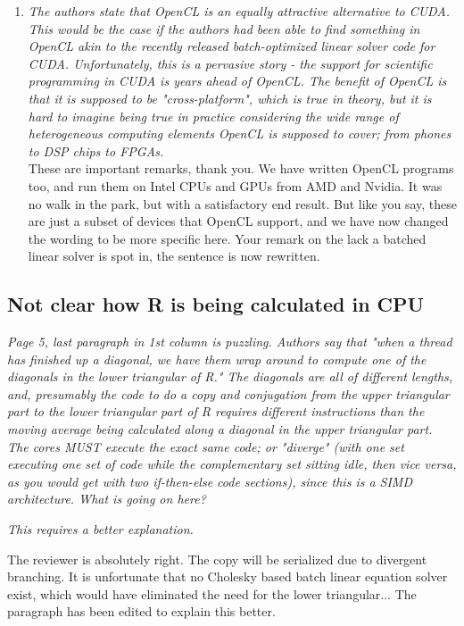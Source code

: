 \documentclass[11pt]{article} %
\newcommand\1{\vec 1}
\newcommand\q[1]{\textit{#1}}
\newcommand\qi[1]{\item\q{#1}}
\newcommand\ans[1]{#1}
\newcommand\ai[1]{\\[.5\baselineskip]\ans{#1}}
\begin{document}
\begin{enumerate}
%
\qi{The authors state that OpenCL is an equally attractive alternative to CUDA. This would be the case if the authors had been able to find something in OpenCL akin to the recently released batch-optimized linear solver code for CUDA. Unfortunately, this is a pervasive story - the support for scientific programming in CUDA is years ahead of OpenCL. The benefit of OpenCL is that it is supposed to be "cross-platform", which is true in theory, but it is hard to imagine being true in practice considering the wide range of heterogeneous computing elements OpenCL is supposed to cover; from phones to DSP chips to FPGAs. }
\ai{These are important remarks, thank you. We have written OpenCL programs too, and run them on Intel CPUs and GPUs from AMD and Nvidia. It was no walk in the park, but with a satisfactory end result. But like you say, these are just a subset of devices that OpenCL support, and we have now changed the wording to be more specific here. Your remark on the lack a batched linear solver is spot in, the sentence is now rewritten.}
\end{enumerate}
 
\subsection{Not clear how R is being calculated in CPU}

\q{
Page 5, last paragraph in 1st column is puzzling. Authors say that "when a thread has finished up a diagonal, we have them wrap around to compute one of the diagonals in the lower triangular of R." The diagonals are all of different lengths, and, presumably the code to do a copy and conjugation from the upper triangular part to the lower triangular part of R requires different instructions than the moving average being calculated along a diagonal in the upper triangular part. The cores MUST execute the exact same code; or "diverge" (with one set executing one set of code while the complementary set sitting idle, then vice versa, as you would get with two if-then-else code sections), since this is a SIMD architecture. What is going on here?}

\q{This requires a better explanation.}

\ans{The reviewer is absolutely right. The copy will be serialized due to divergent branching. It is unfortunate that no Cholesky based batch linear equation solver exist, which would have eliminated the need for the lower triangular... The paragraph has been edited to explain this better.}
\end{document}
